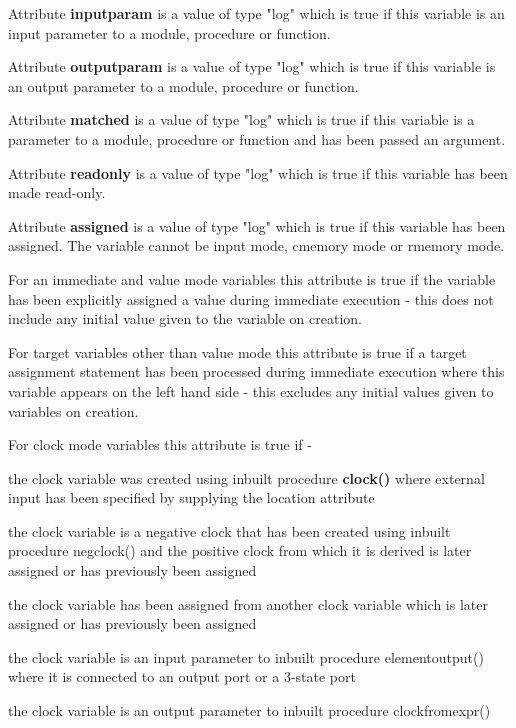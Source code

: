             Attribute {\bf inputparam} is a value of type "log" which is true
            if this variable is an input parameter to a module, procedure or
            function.
            
            Attribute {\bf outputparam} is a value of type "log" which is true
            if this variable is an output parameter to a module, procedure or
            function.
            
            Attribute {\bf matched} is a value of type "log" which is true
            if this variable is a parameter to a module, procedure or
            function and has been passed an argument.
            
            Attribute {\bf readonly} is a value of type "log" which is true
            if this variable has been made read-only.
            
            Attribute {\bf assigned} is a value of type "log" which is true if
            this variable has been assigned. The variable cannot be input mode,
            cmemory mode or rmemory mode.
            
            For an immediate and value mode variables this attribute is true if
            the variable has been explicitly assigned a value during immediate
            execution - this does not include any initial value given to the
            variable on creation.

            For target variables other than value mode this attribute is true
            if a target assignment statement has been processed during immediate
            execution where this variable appears on the left hand side - this
            excludes any initial values given to variables on creation.

            For clock mode variables this attribute is true if -
            \blist
            \item   the clock variable was created using inbuilt procedure {\bf
                    clock()} where external input has been specified by
                    supplying the location attribute
            \item   the clock variable is a negative clock that has been created
                    using inbuilt procedure negclock() and the positive clock from
                    which it is derived is later assigned or has previously been
                    assigned
            \item   the clock variable has been assigned from another clock variable
                    which is later assigned or has previously been assigned
            \item   the clock variable is an input parameter to inbuilt
                    procedure elementoutput() where it is connected to an
                    output port or a 3-state port
            \item   the clock variable is an output parameter to inbuilt
                    procedure clockfromexpr()
            \blend

